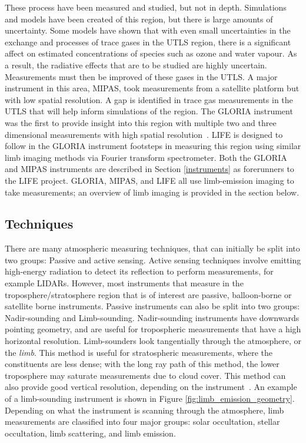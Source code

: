 These process have been measured and studied, but not in depth. Simulations and models have been created of this region, but there is large amounts of uncertainty. Some models have shown that with even small uncertainties in the exchange and processes of trace gases in the UTLS region, there is a significant affect on estimated concentrations of species such as ozone and water vapour. As a result, the radiative effects that are to be studied are highly uncertain. Measurements must then be improved of these gases in the UTLS. A major instrument in this area, MIPAS, took measurements from a satellite platform but with low spatial resolution. A gap is identified in trace gas measurements in the UTLS that will help inform simulations of the region. The GLORIA instrument was the first to provide insight into this region with multiple two and three dimensional measurements with high spatial resolution~\citep{GLORIA_objectives}. LIFE is designed to follow in the GLORIA instrument footsteps in measuring this region using similar limb imaging methods via Fourier transform spectrometer. Both the GLORIA and MIPAS instruments are described in Section \ref{instruments} as forerunners to the LIFE project. GLORIA, MIPAS, and LIFE all use limb-emission imaging to take measurements; an overview of limb imaging is provided in the section below.

\subsection{Techniques} \label{techniques}
There are many atmospheric measuring techniques, that can initially be split into two groups: Passive and active sensing. Active sensing techniques involve emitting high-energy radiation to detect its reflection to perform measurements, for example LIDARs. However, most instruments that measure in the troposphere/stratosphere region that is of interest are passive, balloon-borne or satellite borne instruments. Passive instruments can also be split into two groups: Nadir-sounding and Limb-sounding. Nadir-sounding instruments have downwards pointing geometry, and are useful for tropospheric measurements that have a high horizontal resolution. Limb-sounders look tangentially through the atmosphere, or the \textit{limb}. This method is useful for stratospheric measurements, where the constituents are less dense; with the long ray path of this method, the lower troposphere may saturate measurements due to cloud cover. This method can also provide good vertical resolution, depending on the instrument~\citep{SPARC}. An example of a limb-sounding instrument is shown in Figure \ref{fig:limb_emission_geometry}. Depending on what the instrument is scanning through the atmosphere, limb measurements are classified into four major groups: solar occultation, stellar occultation, limb scattering, and limb emission.

